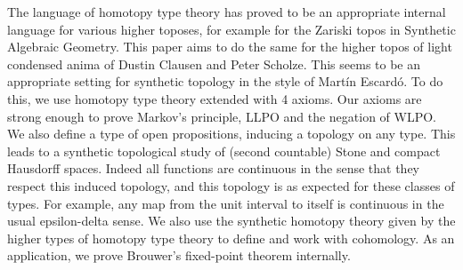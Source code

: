 The language of homotopy type theory has proved to be an appropriate internal language for various higher toposes, 
for example for the Zariski topos in Synthetic Algebraic Geometry. This paper aims to do the same for the higher topos of light condensed anima of Dustin Clausen and Peter Scholze. This seems to be an appropriate setting for synthetic topology in the style of Martín Escardó.
To do this, we use homotopy type theory extended with 4 axioms. Our axioms are strong enough to prove Markov's principle, LLPO and the negation of WLPO. 
We also define a type of open propositions, inducing a topology on any type. This leads to a synthetic topological study of (second countable) Stone and compact Hausdorff spaces. 
Indeed all functions are continuous in the sense that they respect this induced topology, and this topology is as expected for these classes of types.
For example, any map from the unit interval to itself is continuous in the usual epsilon-delta sense.
We also use the synthetic homotopy theory 
given by the higher types of homotopy type theory to define and 
work with cohomology.
As an application, we prove Brouwer's fixed-point theorem
internally. 

